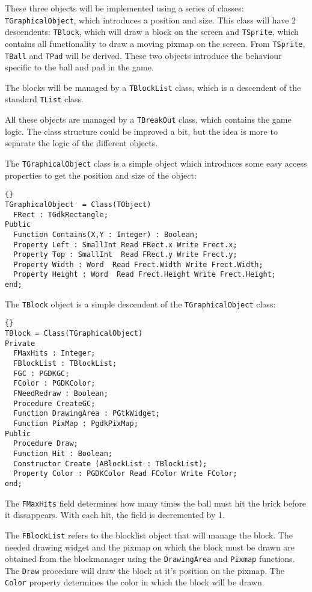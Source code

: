 \documentclass[10pt]{article}
\newcommand{\var}[1]{\texttt{#1}}
\begin{document}
These three objects will be implemented using a series of classes:
\var{TGraphicalObject}, which introduces a position and size. This class
will have 2 descendents: \var{TBlock}, which will draw a block on the
screen and \var{TSprite}, which contains all functionality to draw a moving
pixmap on the screen. From \var{TSprite}, \var{TBall} and \var{TPad} will be
derived. These two objects introduce the behaviour specific to the ball and
pad in the game.

The blocks will be managed by a \var{TBlockList} class, which is a
descendent of the standard \var{TList} class. 

All these objects are managed by a \var{TBreakOut} class, which contains the
game logic. The class structure could be improved a bit, but the idea is
more to separate the logic of the different objects.

The \var{TGraphicalObject} class is a simple object which introduces some 
easy access properties to get the position and size of the object:
\begin{lstlisting}{}
TGraphicalObject  = Class(TObject)
  FRect : TGdkRectangle;
Public 
  Function Contains(X,Y : Integer) : Boolean;
  Property Left : SmallInt Read FRect.x Write Frect.x;
  Property Top : SmallInt  Read FRect.y Write Frect.y;
  Property Width : Word  Read Frect.Width Write Frect.Width;
  Property Height : Word  Read Frect.Height Write Frect.Height;
end;
\end{lstlisting}{}

The \var{TBlock} object is a simple descendent of the \var{TGraphicalObject}
class:
\begin{lstlisting}{}
TBlock = Class(TGraphicalObject)
Private
  FMaxHits : Integer;
  FBlockList : TBlockList;
  FGC : PGDKGC;
  FColor : PGDKColor;
  FNeedRedraw : Boolean;
  Procedure CreateGC;
  Function DrawingArea : PGtkWidget;
  Function PixMap : PgdkPixMap; 
Public
  Procedure Draw;
  Function Hit : Boolean;
  Constructor Create (ABlockList : TBlockList);
  Property Color : PGDKColor Read FColor Write FColor;
end;
\end{lstlisting}{}
The \var{FMaxHits} field determines how many times the ball must hit the
brick before it dissappears. With each hit, the field is decremented by 1.

The \var{FBlockList} refers to the blocklist object that will manage the 
block. The needed drawing widget and the pixmap on which the block must be
drawn are obtained from the blockmanager using the \var{DrawingArea} and 
\var{Pixmap} functions.
The \var{Draw} procedure will draw the block at it's position on the pixmap.
The \var{Color} property determines the color in which the block will be
drawn.
\end{document}
